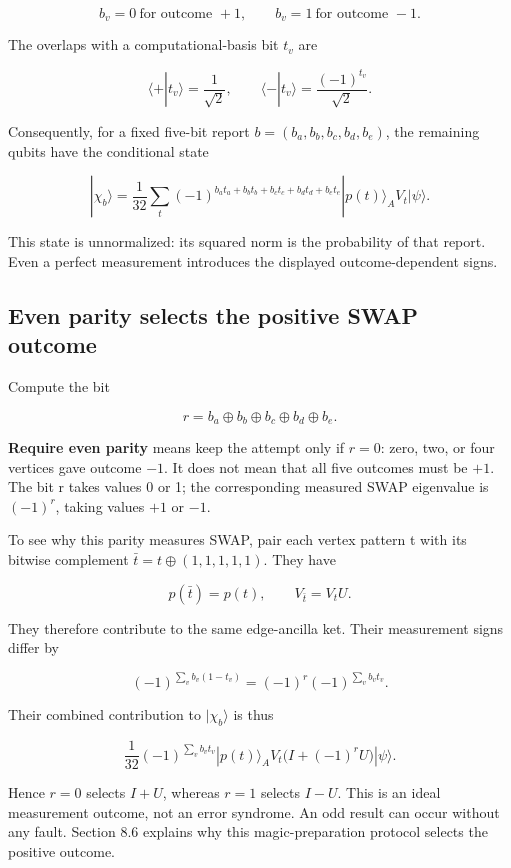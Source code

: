 \documentclass[11pt]{article}
\begin{document}
\[
b_v=0\ \text{for outcome }+1,\qquad
b_v=1\ \text{for outcome }-1.
\]

The overlaps with a computational-basis bit \(t_v\) are

\[
\langle+|t_v\rangle=\frac1{\sqrt2},\qquad
\langle-|t_v\rangle=\frac{(-1)^{t_v}}{\sqrt2}.
\]

Consequently, for a fixed five-bit report \(b=(b_a,b_b,b_c,b_d,b_e)\), the remaining qubits have the conditional state

\[
|\chi_b\rangle
=\frac1{32}\sum_t
(-1)^{b_at_a+b_bt_b+b_ct_c+b_dt_d+b_et_e}
|p(t)\rangle_A V_t|\psi\rangle.
\]

This state is unnormalized: its squared norm is the probability of that report. Even a perfect measurement introduces the displayed outcome-dependent signs.

\subsection{Even parity selects the positive SWAP outcome}
Compute the bit

\[
r=b_a\oplus b_b\oplus b_c\oplus b_d\oplus b_e.
\]

\textbf{Require even parity} means keep the attempt only if \(r=0\): zero, two, or four vertices gave outcome \(-1\). It does not mean that all five outcomes must be \(+1\). The bit r takes values 0 or 1; the corresponding measured SWAP eigenvalue is \((-1)^r\), taking values \(+1\) or \(-1\).

To see why this parity measures SWAP, pair each vertex pattern t with its bitwise complement \(\bar t=t\oplus(1,1,1,1,1)\). They have

\[
p(\bar t)=p(t),\qquad V_{\bar t}=V_tU.
\]

They therefore contribute to the same edge-ancilla ket. Their measurement signs differ by

\[
(-1)^{\sum_v b_v(1-t_v)}
=(-1)^r(-1)^{\sum_v b_vt_v}.
\]

Their combined contribution to \(|\chi_b\rangle\) is thus

\[
\frac1{32}(-1)^{\sum_vb_vt_v}
|p(t)\rangle_A V_t\bigl(I+(-1)^rU\bigr)|\psi\rangle.
\]

Hence \(r=0\) selects \(I+U\), whereas \(r=1\) selects \(I-U\). This is an ideal measurement outcome, not an error syndrome. An odd result can occur without any fault. Section 8.6 explains why this magic-preparation protocol selects the positive outcome.
\end{document}
